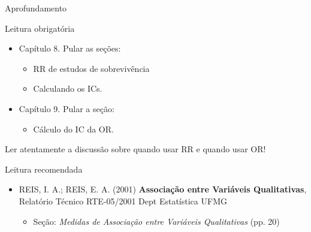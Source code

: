 \documentclass{beamer}
\begin{document}
\begin{frame}{\scriptsize Aprofundamento}
  \footnotesize
  \begin{block}{Leitura obrigatória}
    \footnotesize
    \begin{itemize}
    \item Capítulo 8. Pular as seções:
      \begin{itemize}
        \scriptsize
      \item RR de estudos de sobrevivência
      \item Calculando os ICs.
      \end{itemize}
    \item Capítulo 9. Pular a seção:
      \begin{itemize}
        \scriptsize
      \item Cálculo do IC da OR.
      \end{itemize}
    \end{itemize}
    \begin{block}{}
      \scriptsize
      \centering
      Ler \alert{atentamente} a discussão sobre quando usar RR e quando usar OR!
    \end{block}
  \end{block}
  \begin{block}{Leitura recomendada}
    \begin{itemize}
    \scriptsize
    \item REIS, I. A.; REIS, E. A. (2001) {\bf Associação entre Variáveis Qualitativas}, Relatório Técnico RTE-05/2001 Dept Estatística UFMG
      \begin{itemize}
        \tiny
      \item Seção: {\em Medidas de Associação entre Variáveis Qualitativas} (pp. 20)
      \end{itemize}
    \end{itemize}
  \end{block}
\end{frame}
\end{document}
